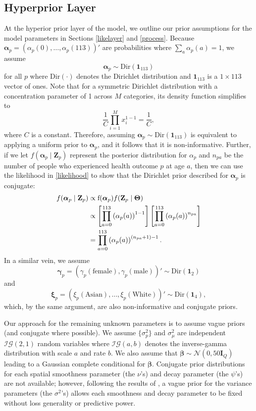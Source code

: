 \documentclass[final]{statsoc}
\begin{document}
\subsection{Hyperprior Layer}
At the hyperior prior layer of the model, we outline our prior assumptions for the model 
parameters in Sections \ref{likelayer} and \ref{process}. Because $\boldsymbol{\alpha}_p = 
(\alpha_p(0),\dots,\alpha_p(113))'$ are probabilities where $\sum_a \alpha_p(a) = 1$, 
we assume $$\boldsymbol{\alpha}_{p} \sim \text{Dir}(\mathbf{1}_{113})$$ for all $p$ where 
$\text{Dir}(\cdot)$ denotes the Dirichlet distribution and $\mathbf{1}_{113}$ is a $1\times 113$ vector of ones. Note that for a symmetric Dirichlet distribution with a concentration parameter of 1 across $M$ categories, its density function simplifies to 
\begin{equation}
\frac{1}{C}\prod_{i=1}^M x_i^{1 - 1} = \frac{1}{C},
\end{equation}
where $C$ is a constant. Therefore, assuming $\boldsymbol\alpha_p \sim \text{Dir}(\mathbf{1}_{113})$ is equivalent to applying a uniform prior to $\boldsymbol\alpha_p$, and it follows that it is non-informative. Further, if we let $f(\boldsymbol\alpha_p \mid \mathbf{Z}_p)$ represent the posterior distribution for $\alpha_p$ and $n_{pa}$ be the number of people who experienced health outcome $p$ at age $a$, then we can use the likelihood in \eqref{likelihood} to show that the Dirichlet prior described for $\boldsymbol{\alpha}_p$ is conjugate:  
\begin{align}
f(\boldsymbol{\alpha}_p \mid \mathbf{Z}_p) &\propto \text{f}(\boldsymbol{\alpha}_p)f(\mathbf{Z}_p \mid \boldsymbol\Theta) \notag \\
&\propto \left[\prod_{a=0}^{113}\left(\alpha_p(a)\right)^{1-1}\right]\left[\prod_{a=0}^{113} \left(\alpha_p(a)\right)^{n_{pa}}\right]  \label{apost} \\
&= \prod_{a=0}^{113} \left(\alpha_p(a)\right)^{(n_{pa}+1)-1}. \notag
\end{align} 
In a similar vein, we assume $$\boldsymbol\gamma_p = (\gamma_p(\text{female}), \gamma_p(\text{male}))' \sim \text{Dir}(\mathbf{1}_2)$$ and $$\boldsymbol\xi_p = (\xi_p(\text{Asian}), \dots, \xi_p(\text{White}))' \sim \text{Dir}(\mathbf{1}_4),$$ which, by the same argument, are also non-informative and conjugate priors. 

Our approach for the remaining unknown parameters is to assume vague priors (and conjugate 
where possible). We assume $\{\sigma^2_p\}$ and $\sigma^2_\mu$ are independent 
$\mathcal{IG}\left(2, 1\right)$ 
random variables where $\mathcal{IG}(a,b)$ denotes the inverse-gamma distribution with scale 
$a$ and rate $b$. We also assume that $\boldsymbol{\beta} \sim 
\mathcal{N}(0, 50\mathbf{I}_{Q})$ leading to a Gaussian complete conditional for $\boldsymbol{\beta}$.  
Conjugate prior distributions for each spatial smoothness parameter (the $\nu$'s) and decay 
parameter (the $\psi$'s) are not available; however, following the results of \cite{Zhang2004}, 
a vague prior for the variance parameters (the $\sigma^2$'s) allows each smoothness and decay 
parameter to be fixed without loss generality or predictive power.
\end{document}
